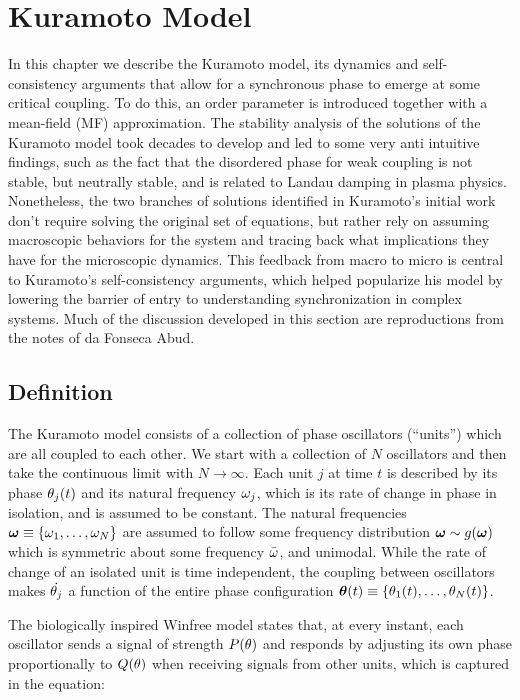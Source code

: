 \chapter{Kuramoto Model}
\label{chap:kuramoto}


In this chapter we describe the Kuramoto model, its dynamics and self-consistency arguments that allow for a synchronous phase to
emerge at some critical coupling. To do this, an order parameter is introduced together with a mean-field (MF) approximation. The
stability analysis of the solutions of the Kuramoto model took decades to develop and led to some very anti intuitive findings, such as
the fact that the disordered phase for weak coupling is not stable, but neutrally stable, and is related to Landau damping in plasma
physics.  Nonetheless, the two branches of solutions identified in Kuramoto's initial work don't require solving the original set of
equations, but rather rely on assuming macroscopic behaviors for the system and tracing back what implications they have for the
microscopic dynamics.  This feedback from macro to micro is central to Kuramoto's self-consistency arguments, which helped popularize
his model by lowering the barrier of entry to understanding synchronization in complex systems. Much of the discussion developed in
this section are reproductions from the notes of da Fonseca Abud\cite{da_Fonseca_2018}.


\section{Definition}

The Kuramoto model consists of a collection of phase oscillators (``units'') which are all coupled to each other. We start with a
collection of $N$ oscillators and then take the continuous limit with $N \to \infty$. Each unit $j$ at time $t$ is described by its
phase $\theta_j(t)$ and its natural frequency $\omega_j$, which is its rate of change in phase in isolation, and is assumed to be
constant. The natural frequencies $\bm{\omega}\equiv \{\omega_1,\dots,\omega_N\}$ are assumed to follow some frequency distribution
$\bm{\omega} \sim g(\bm{\omega})$ which is symmetric about some frequency $\bar{\omega}$, and unimodal. While the rate of change of
an isolated unit is time independent, the coupling between oscillators makes $\dot{\theta_j}$ a function of the entire phase
configuration $\bm{\theta}(t) \equiv \{ \theta_1(t), \dots, \theta_N(t)\}$.

The biologically inspired Winfree model states that, at every instant, each oscillator sends a signal of strength $P(\theta)$ and
responds by adjusting its own phase proportionally to $Q(\theta)$ when receiving signals from other units, which is captured in
the equation:

